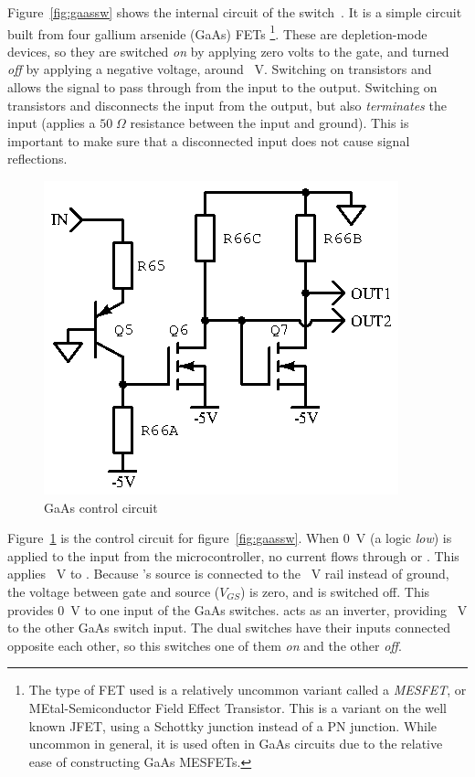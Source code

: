 Figure~\ref{fig:gaassw} shows the internal circuit of the
switch~\cite{maswss0162}.  It is a simple circuit built from four gallium
arsenide (GaAs) FETs \footnote{The type of FET used is a relatively uncommon
    variant called a \emph{MESFET}, or MEtal-Semiconductor Field Effect
Transistor. This is a variant on the well known JFET, using a Schottky junction
instead of a PN junction. While uncommon in general, it is used often in GaAs
circuits due to the relative ease of constructing GaAs MESFETs.}.  These are
depletion-mode devices, so they are switched \emph{on} by applying zero volts
to the gate, and turned \emph{off} by applying a negative voltage, around
~V.  Switching on transistors  and  allows the
signal to pass through from the input to the output. Switching on transistors
 and  disconnects the input from the output, but also
\emph{terminates} the input (applies a $50\;\Omega$ resistance between the
input and ground). This is important to make sure that a disconnected input
does not cause signal reflections.

\begin{figure}[H]
\centering
\includegraphics{gaasctl}
\caption{GaAs control circuit}
\label{fig:gaasctl}
\end{figure}

Figure~\ref{fig:gaasctl} is the control circuit for figure~\ref{fig:gaassw}.
When 0~V (a logic \emph{low}) is applied to the input from the
microcontroller, no current flows through  or .
This applies ~V to . Because 's source is
connected to the ~V rail instead of ground, the voltage between gate
and source ($V_{GS}$) is zero, and  is switched off.
This provides 0~V to one input of the GaAs switches.  acts
as an inverter, providing ~V to the other GaAs switch input. The
dual switches have their inputs connected opposite each other, so this
switches one of them \emph{on} and the other \emph{off}.

